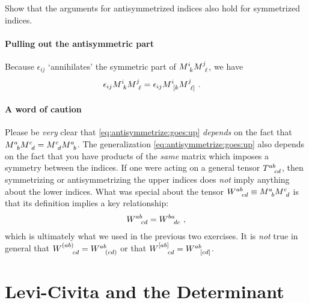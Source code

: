 \begin{exercise}
Show that the arguments for antisymmetrized indices also hold for symmetrized indices.
\end{exercise}

\paragraph{Pulling out the antisymmetric part}
Because $\epsilon_{ij}$ `annihilates' the symmetric part of $M\aij{i}{k}M\aij{j}{\ell}$, we have
\begin{align}
    \epsilon_{ij}
    M\aij{i}{k}M\aij{j}{\ell}
    &=
    \epsilon_{ij}
    M\aij{i}{[k}M\aij{j}{\ell]} \ .
    \label{eq:det:invariant:int:lemma:eps:M:anti}
\end{align}

\paragraph{A word of caution}
Please be \emph{very} clear that \eqref{eq:antisymmetrize:goes:up} \emph{depends} on the fact that $M\aij{a}{b}M\aij{c}{d} = M\aij{c}{d} M\aij{a}{b}$. The generalization \eqref{eq:antisymmetrize:goes:up} also depends on the fact that you have products of the \emph{same} matrix which imposes a symmetry between the indices. If one were acting on a general tensor $T\aij{ab}{cd}$, then symmetrizing or antisymmetrizing the upper indices does \emph{not} imply anything about the lower indices. What was special about the tensor $W\aij{ab}{cd} \equiv M\aij{a}{b}M\aij{c}{d}$ is that its definition implies a key relationship:
\begin{align}
    W\aij{ab}{cd} = W\aij{ba}{dc} \ ,
\end{align}
which is ultimately what we used in the previous two exercises. It is \emph{not} true in general that $W\aij{(ab)}{cd} = W\aij{ab}{(cd)}$ or that $W\aij{[ab]}{cd} = W\aij{ab}{[cd]}$.


\section{Levi-Civita and the Determinant}
\label{sec:levi:civita:determinant}

